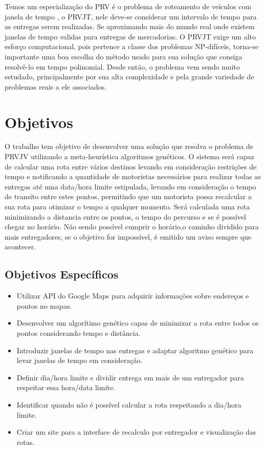 Temos um especialização do PRV é o problema de roteamento de veículos com janela de tempo , o PRVJT, nele deve-se considerar um intervalo de tempo para as entregas serem realizadas. Se aproximando mais do mundo real onde existem janelas de tempo validas para entregas de mercadorias.
O PRVJT exige um alto esforço computacional, pois pertence a classe dos problemas NP-difíceis, torna-se importante uma boa escolha do método usado para sua solução que consiga resolvê-lo em tempo polinomial.
Desde então, o problema vem sendo muito estudado, principalmente por sua alta complexidade e pela grande variedade de problemas reais a ele associados.

\section{Objetivos}

O trabalho tem objetivo de desenvolver uma solução que resolva o problema de PRVJV utilizando a meta-heurística algoritmos genéticos. 
O sistema será capaz de calcular uma rota entre vários destinos levando em consideração restrições de tempo e notificando a quantidade de motoristas necessários para realizar todas as entregas até uma data/hora limite estipulada, levando em consideração o tempo de transito entre estes pontos, permitindo que um motorista possa recalcular a sua rota para otimizar o tempo a qualquer momento.
Será calculada uma rota minimizando a distancia entre os pontos, o tempo do percurso e se é possível chegar no horário.
Não sendo possível cumprir o horário,o caminho dividido para mais entregadores, se o objetivo for impossível, é emitido um aviso sempre que acontecer.

\subsection{Objetivos Específicos}

\begin{itemize}
	\item Utilizar API do Google Maps para adquirir informações sobre endereços e pontos no mapas.
	\item Desenvolver um algorítimo genético capas de minimizar a rota entre todos os pontos considerando tempo e distância.
	\item Introduzir janelas de tempo nas entregas e adaptar algoritmo genético para levar janelas de tempo em consideração.
	\item Definir dia/hora limite e dividir entrega em mais de um entregador para respeitar essa hora/data limite. 
	\item Identificar quando não é possível calcular a rota respeitando a dia/hora limite.
	\item Criar um site para a interface de recalculo por entregador e visualização das rotas.
\end{itemize}


